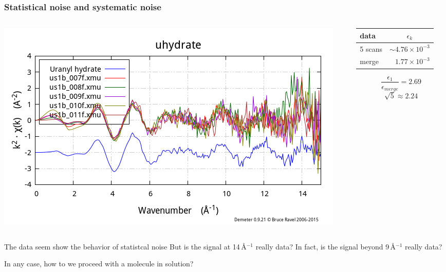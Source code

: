 \documentclass[10pt, xcolor=x11names, compress]{beamer}
\begin{document}
\begin{frame}
  \frametitle{Statistical noise and systematic noise}
  \begin{columns}[T]
    \begin{column}{0.5\linewidth}
      \includegraphics[width=\linewidth]{images/merged_chi.png}
      
    \end{column}
    \begin{column}{0.5\linewidth}
      \begin{tabular}{lr}
        data & \multicolumn{1}{c}{$\epsilon_k$} \\
        \hline
        5 scans & $\sim4.76\times10^{-3}$ \\
        merge   & $1.77\times10^{-3}$
      \end{tabular}
      $$\frac{\epsilon_1}{\epsilon_{merge}} = 2.69$$
      $$\sqrt{5} \approx 2.24$$
    \end{column}
  \end{columns}
  \begin{block}{The data seem show the behavior of statistcal noise}
    But is the signal at 14\,\AA$^{-1}$ really data?  In fact, is the
    signal beyond 9\,\AA$^{-1}$ really data?
  \end{block}
  \begin{alertblock}{}
    \centering In any case, how to we proceed with a molecule in solution?
  \end{alertblock}
\end{frame}
\end{document}

